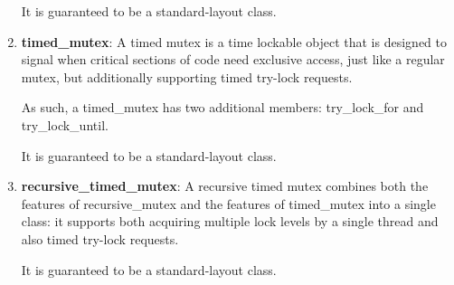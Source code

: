 \documentclass[UTF8,a4paper,12pt]{ctexbook}
\begin{document}
\begin{enumerate}[itemindent = 1em]
					It is guaranteed to be a standard-layout class.
				\item \textbf{timed\_mutex}:
					A timed mutex is a time lockable object that is designed to signal when critical sections of code need exclusive access, just like a regular mutex, but additionally supporting timed try-lock requests.
					
					As such, a timed\_mutex has two additional members: try\_lock\_for and try\_lock\_until.
					
					It is guaranteed to be a standard-layout class.
				\item \textbf{recursive\_timed\_mutex}:
					A recursive timed mutex combines both the features of recursive\_mutex and the features of timed\_mutex into a single class: it supports both acquiring multiple lock levels by a single thread and also timed try-lock requests.
					
					It is guaranteed to be a standard-layout class.
			\end{enumerate}
\end{document}
